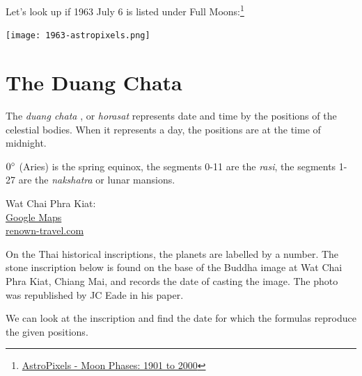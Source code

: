 \documentclass[11pt,oneside]{memoir-article}
\begin{document}
\bigskip

Let's look up if 1963 July 6 is listed under Full Moons:\footnote{\href{http://astropixels.com/ephemeris/phasescat/phases1901.html}{AstroPixels - Moon Phases: 1901 to 2000}}

\bigskip

{\centering
\texttt{[image: 1963-astropixels.png]}
\par}

\label{calculating-the-sun-and-moon-end}

\clearpage

\chapter{The Duang Chata}
\label{sec-5}
\label{duangchata}

The \emph{duang chata} , or \emph{horasat}  represents date
and time by the positions of the celestial bodies. When it represents a day, the
positions are at the time of midnight.

$0^\circ$ (Aries) is the spring equinox, the segments 0-11 are the \emph{rasi}, the
segments 1-27 are the \emph{nakshatra} or lunar mansions.

\begin{marginfigure}[\baselineskip]
\raggedright\footnotesize
Wat Chai Phra Kiat:\\
\href{https://encrypted.google.com/maps/place/Wat+Chai+Phrakiat/@18.7886216,98.9857345,20z/}{Google Maps}\\
\href{https://www.renown-travel.com/temples/wat-chai-phra-kiat.html}{renown-travel.com}
\end{marginfigure}

On the Thai historical inscriptions, the planets are labelled by a
number.\autocite[p. 79]{eade1995calendrical} The stone inscription below is
found on the base of the Buddha image at Wat Chai Phra Kiat, Chiang Mai, and
records the date of casting the image.\footnotemark{} The photo was republished by
JC Eade in his paper.\autocite{eade1993mangrai}


We can look at the inscription and find the date for which the formulas
reproduce the given positions.

\bigskip
\end{document}
